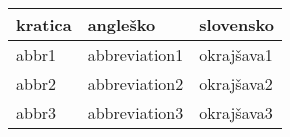%
%

\begin{table}[h]
    \centering
    \begin{tabular}{l|ll}
        \textbf{kratica} & \textbf{angleško} & \textbf{slovensko} \\ \hline
        abbr1            & abbreviation1     & okrajšava1         \\
        abbr2            & abbreviation2     & okrajšava2         \\
        abbr3            & abbreviation3     & okrajšava3         \\
    \end{tabular}
\end{table}

